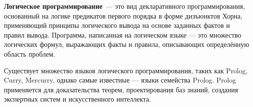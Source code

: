 {\bf Логическое программирование}~--- это вид декларативного программирования,
основанный на логике предикатов первого порядка в форме дизъюнктов Хорна,
применяющий принципы логического вывода на основе заданных фактов и правил вывода.
Программа, написанная на логическом языке --- это множество логических формул,
выражающих факты и правила, описывающих определённую область проблем.
\cite{logicMJ}

Существует множество языков логического программирования, таких как Prolog, Curry, Mercurry,
однако самые известные --- языки семейства Prolog. Prolog применяется для доказательства
теорем, проектирования баз знаний, создания экспертных систем и искусственного интеллекта.

% 
% 
% 
